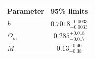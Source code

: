 \begin{tabular} { l  c}

 Parameter &  95\% limits\\
\hline
{\boldmath$h              $} & $0.7018^{+0.0033}_{-0.0033}$\\

{\boldmath$Ω_m            $} & $0.285^{+0.018}_{-0.017}   $\\

{\boldmath$M              $} & $0.13^{+0.40}_{-0.38}      $\\
\hline
\end{tabular}